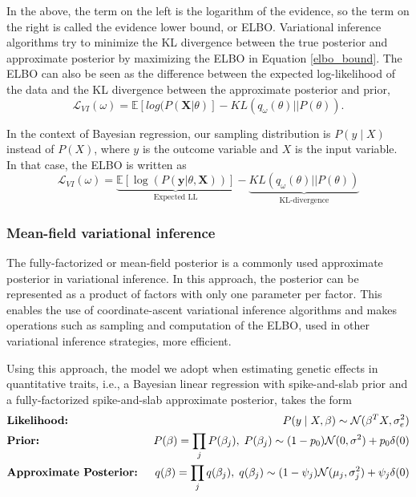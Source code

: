 %
In the above, the term on the left is the logarithm of the evidence, so the term on the right is called the evidence lower bound, or ELBO.
%
Variational inference algorithms try to minimize the KL divergence between the true posterior and approximate posterior by maximizing the ELBO in Equation \ref{elbo_bound}.
%
The ELBO can also be seen as the difference between the expected log-likelihood of the data and the KL divergence between the approximate posterior and prior,
\begin{equation}
    \mathcal{L}_{VI}(\omega) = \mathbb{E}[log(P( \textbf{X}|\theta)] - KL(q_{\omega}(\theta)||P(\theta)).
\end{equation}

%
In the context of Bayesian regression, our sampling distribution is $P(y \mid X)$ instead of $P(X)$, where $y$ is the outcome variable and $X$ is the input variable.
%
In that case, the ELBO is written as
\begin{equation}
    \mathcal{L}_{VI}(\omega) = \underbrace{\mathbb{E}[\log(P( \textbf{y}|\theta, \textbf{X}))]}_{\text{Expected LL}} - \underbrace{KL(q_{\omega}(\theta)||P(\theta))}_{\text{KL-divergence}}
    \label{elbo_blr}
\end{equation}

\subsubsection{Mean-field variational inference}

The fully-factorized or mean-field posterior is a commonly used approximate posterior in variational inference.
%
In this approach, the posterior can be represented as a product of factors with only one parameter per factor.
%
This enables the use of coordinate-ascent variational inference algorithms and makes operations such as sampling and computation of the ELBO, used in other variational inference strategies, more efficient.
%

%
Using this approach, the model we adopt when estimating genetic effects in quantitative traits, i.e., a Bayesian linear regression with spike-and-slab prior and a fully-factorized spike-and-slab approximate posterior, takes the form
\begin{align}
    &\text{\textbf{Likelihood:} } &P(y \mid X, \beta) \sim \mathcal{N}(\beta^T X, \sigma_e^2) \nonumber \\
    &\text{\textbf{Prior:} } &P(\beta) = \prod_j P(\beta_j), \hspace{1mm} P(\beta_j) \sim (1-p_0)\mathcal{N} (0, \sigma ^ 2) + p_0 \delta(0) \nonumber \\
    &\text{\textbf{Approximate Posterior:} } &q(\beta) = \prod_j q(\beta_j), \hspace{1mm} q(\beta_j) \sim (1-\psi_j)\mathcal{N}(\mu_j, \sigma^2_j) + \psi_j \delta(0)
    \label{spike-and-slab-model}
\end{align}

